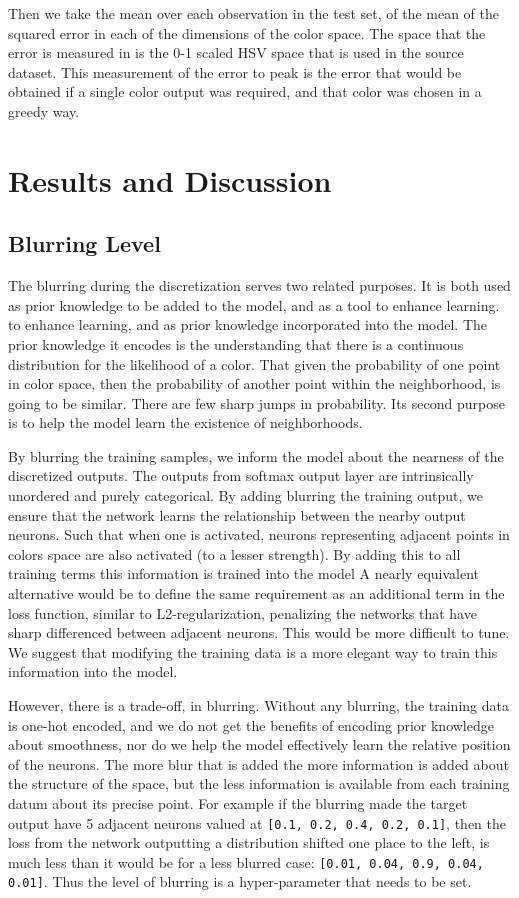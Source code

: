 \documentclass[11pt,letterpaper]{article}
\begin{document}
Then we take the mean over each observation in the test set, of the mean of the squared error in each of the dimensions of the color space.
The space that the error is measured in is the 0-1 scaled HSV space that is used in the source dataset.
This measurement of the error to peak is the error that would be obtained if a single color output was required, and that color was chosen in a greedy way.



\section{Results and Discussion}

\subsection{Blurring Level}
The blurring during the discretization serves two related purposes.
It is both used as prior knowledge to be added to the model, and as a tool to enhance learning.
to enhance learning, and as prior knowledge incorporated into the model. 
The prior knowledge it encodes is the understanding that there is a continuous distribution for the likelihood of a color.
That given the probability of one point in color space, then the probability of another point within the neighborhood, is going to be similar.
There are few sharp jumps in probability.
Its second purpose is to help the model learn the existence of neighborhoods.

By blurring the training samples, we inform the model about the nearness of the discretized outputs.
The outputs from softmax output layer are intrinsically unordered and purely categorical.
By adding blurring the training output, we ensure that the network learns the relationship between the nearby output neurons.
Such that when one is activated, neurons representing  adjacent points in colors space are also activated (to a lesser strength).
By adding this to all training terms this information is trained into the model
A nearly equivalent alternative would be to define the same requirement as an additional term in the loss function, similar to L2-regularization, penalizing the networks that have sharp differenced between adjacent neurons.
This would be more difficult to tune.
We suggest that modifying the training data is a more elegant way to train this information into the model.

However, there is a trade-off, in blurring.
Without any blurring, the training data is one-hot encoded, and we do not get the benefits of encoding prior knowledge about smoothness, nor do we help the model effectively learn the relative position of the neurons.
The more blur that is added the more information is added about the structure of the space,
but the less information is available from each training datum about its precise point.
For example if the blurring made the target output have 5 adjacent neurons valued at \texttt{[0.1, 0.2, 0.4, 0.2, 0.1]}, then the loss from the network outputting a distribution shifted one place to the left, is much less than it would be for a less blurred case: \texttt{[0.01, 0.04, 0.9, 0.04, 0.01]}.
Thus the level of blurring is a hyper-parameter that needs to be set.
\end{document}
